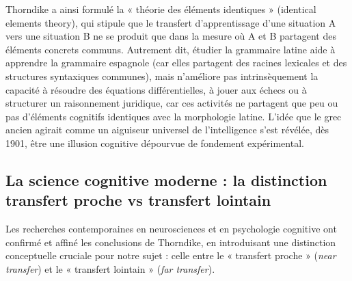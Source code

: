 Thorndike a ainsi formulé la « théorie des éléments identiques » (identical elements theory), qui
stipule que le transfert d'apprentissage d'une situation A vers une situation B ne se produit que
dans la mesure où A et B partagent des éléments concrets communs.\cite{II-1-2-ref6} Autrement dit,
étudier la grammaire latine aide à apprendre la grammaire espagnole (car elles partagent des racines
lexicales et des structures syntaxiques communes), mais n'améliore pas intrinsèquement la capacité à
résoudre des équations différentielles, à jouer aux échecs ou à structurer un raisonnement
juridique, car ces activités ne partagent que peu ou pas d'éléments cognitifs identiques avec la
morphologie latine.\cite{II-1-2-ref16} L'idée que le grec ancien agirait comme un aiguiseur
universel de l'intelligence s'est révélée, dès 1901, être une illusion cognitive dépourvue de
fondement expérimental.



\subsection{La science cognitive moderne : la distinction transfert proche vs transfert lointain}

Les recherches contemporaines en neurosciences et en psychologie cognitive ont confirmé et affiné
les conclusions de Thorndike, en introduisant une distinction conceptuelle cruciale pour notre sujet
: celle entre le « transfert proche » (\textit{near transfer}) et le « transfert lointain »
(\textit{far transfer}).\cite{II-1-2-ref7}

